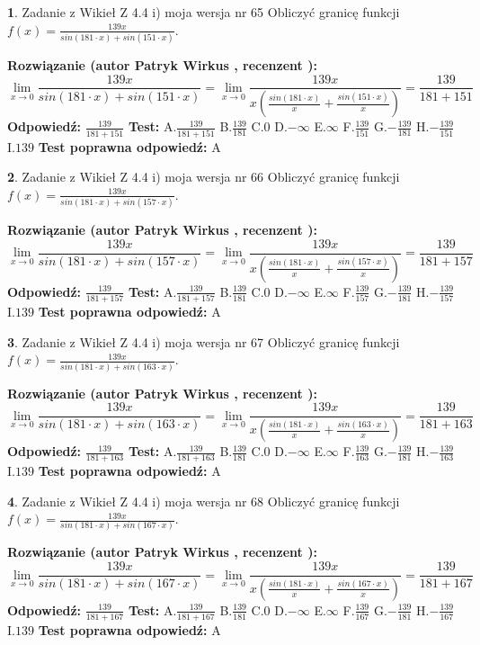 \documentclass[12pt, a4paper]{article}
\theoremstyle{definition} %
\newtheorem{zad}{}
\newcommand{\zadStart}[1]{\begin{zad}#1\newline}
\newcommand{\zadStop}{\end{zad}}
\newcommand{\rozwStart}[2]{\noindent \textbf{Rozwiązanie (autor #1 , recenzent #2): }\newline}
\newcommand{\rozwStop}{\newline}
\newcommand{\odpStart}{\noindent \textbf{Odpowiedź:}\newline}
\newcommand{\odpStop}{\newline}
\newcommand{\testStart}{\noindent \textbf{Test:}\newline}
\newcommand{\testStop}{\newline}
\newcommand{\kluczStart}{\noindent \textbf{Test poprawna odpowiedź:}\newline}
\newcommand{\kluczStop}{\newline}
\begin{document}
\zadStart{Zadanie z Wikieł Z 4.4 i) moja wersja nr 65}
Obliczyć granicę funkcji $f(x)=\frac{139x}{sin(181\cdot x) +sin(151\cdot x)}$.
\zadStop
\rozwStart{Patryk Wirkus}{}
$$\lim\limits_{x\to 0}\frac{139x}{sin(181\cdot x) +sin(151\cdot x)}=\lim\limits_{x\to 0}\frac{139x}{x(\frac{sin(181\cdot x)}{x}+\frac{sin(151\cdot x)}{x})}=\frac{139}{181+151}$$
\rozwStop
\odpStart
$\frac{139}{181+151}$
\odpStop
\testStart
A.$\frac{139}{181+151}$
B.$\frac{139}{181}$
C.$0$
D.$-\infty$
E.$\infty$
F.$\frac{139}{151}$
G.$-\frac{139}{181}$
H.$-\frac{139}{151}$
I.$139$
\testStop
\kluczStart
A
\kluczStop



\zadStart{Zadanie z Wikieł Z 4.4 i) moja wersja nr 66}
Obliczyć granicę funkcji $f(x)=\frac{139x}{sin(181\cdot x) +sin(157\cdot x)}$.
\zadStop
\rozwStart{Patryk Wirkus}{}
$$\lim\limits_{x\to 0}\frac{139x}{sin(181\cdot x) +sin(157\cdot x)}=\lim\limits_{x\to 0}\frac{139x}{x(\frac{sin(181\cdot x)}{x}+\frac{sin(157\cdot x)}{x})}=\frac{139}{181+157}$$
\rozwStop
\odpStart
$\frac{139}{181+157}$
\odpStop
\testStart
A.$\frac{139}{181+157}$
B.$\frac{139}{181}$
C.$0$
D.$-\infty$
E.$\infty$
F.$\frac{139}{157}$
G.$-\frac{139}{181}$
H.$-\frac{139}{157}$
I.$139$
\testStop
\kluczStart
A
\kluczStop



\zadStart{Zadanie z Wikieł Z 4.4 i) moja wersja nr 67}
Obliczyć granicę funkcji $f(x)=\frac{139x}{sin(181\cdot x) +sin(163\cdot x)}$.
\zadStop
\rozwStart{Patryk Wirkus}{}
$$\lim\limits_{x\to 0}\frac{139x}{sin(181\cdot x) +sin(163\cdot x)}=\lim\limits_{x\to 0}\frac{139x}{x(\frac{sin(181\cdot x)}{x}+\frac{sin(163\cdot x)}{x})}=\frac{139}{181+163}$$
\rozwStop
\odpStart
$\frac{139}{181+163}$
\odpStop
\testStart
A.$\frac{139}{181+163}$
B.$\frac{139}{181}$
C.$0$
D.$-\infty$
E.$\infty$
F.$\frac{139}{163}$
G.$-\frac{139}{181}$
H.$-\frac{139}{163}$
I.$139$
\testStop
\kluczStart
A
\kluczStop



\zadStart{Zadanie z Wikieł Z 4.4 i) moja wersja nr 68}
Obliczyć granicę funkcji $f(x)=\frac{139x}{sin(181\cdot x) +sin(167\cdot x)}$.
\zadStop
\rozwStart{Patryk Wirkus}{}
$$\lim\limits_{x\to 0}\frac{139x}{sin(181\cdot x) +sin(167\cdot x)}=\lim\limits_{x\to 0}\frac{139x}{x(\frac{sin(181\cdot x)}{x}+\frac{sin(167\cdot x)}{x})}=\frac{139}{181+167}$$
\rozwStop
\odpStart
$\frac{139}{181+167}$
\odpStop
\testStart
A.$\frac{139}{181+167}$
B.$\frac{139}{181}$
C.$0$
D.$-\infty$
E.$\infty$
F.$\frac{139}{167}$
G.$-\frac{139}{181}$
H.$-\frac{139}{167}$
I.$139$
\testStop
\kluczStart
A
\kluczStop
\end{document}
